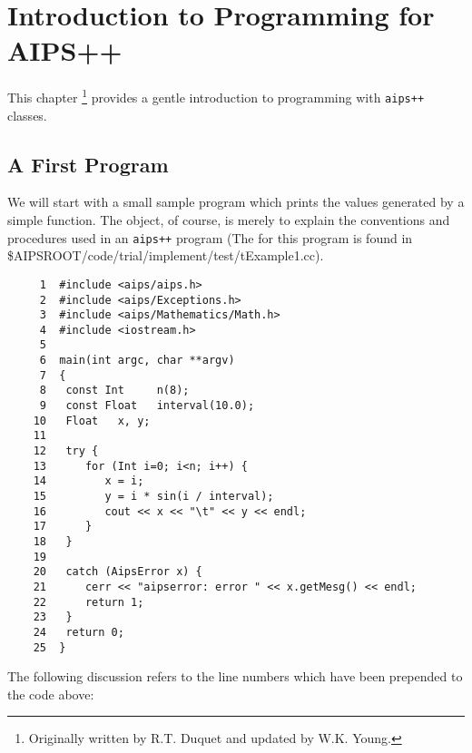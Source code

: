 \chapter{Introduction to Programming for AIPS++ \label{Coding.IntroToProgramming}}

This chapter \footnote{Originally written by R.T. Duquet and updated by W.K. Young.} provides a
gentle introduction to programming with {\tt aips++} classes.\\

\section{A First Program \label{Coding.FirstProgram}}
        We will start with a small sample program which prints
the values generated by a simple function.  The object, of course, is
merely to explain the conventions and procedures used in an {\tt aips++}
program 
(The 
for this program is found in 
\$AIPSROOT/code/trial/implement/test/tExample1.cc). 


\begin{verbatim}
     1  #include <aips/aips.h>
     2  #include <aips/Exceptions.h>
     3  #include <aips/Mathematics/Math.h>
     4  #include <iostream.h>
     5
     6  main(int argc, char **argv)
     7  {
     8   const Int     n(8);
     9   const Float   interval(10.0);
    10   Float   x, y;
    11
    12   try {
    13      for (Int i=0; i<n; i++) {
    14         x = i;
    15         y = i * sin(i / interval);
    16         cout << x << "\t" << y << endl;
    17      }
    18   }
    19
    20   catch (AipsError x) {
    21      cerr << "aipserror: error " << x.getMesg() << endl;
    22      return 1;
    23   }
    24   return 0;
    25  }

\end{verbatim}

The following discussion refers to the line numbers which have been
prepended to the code above:

